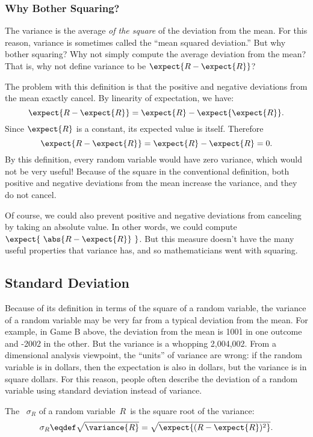 \subsubsection{Why Bother Squaring?}

The variance is the average \emph{of the square} of the deviation from the
mean.  For this reason, variance is sometimes called the ``mean squared
deviation.''  But why bother squaring?  Why not simply compute the average
deviation from the mean?  That is, why not define variance to be
$\expect{R - \expect{R}}$?

The problem with this definition is that the positive and negative
deviations from the mean exactly cancel.  By linearity of expectation,
we have:
\[
  \expect{R - \expect{R}} = \expect{R} - \expect{\expect{R}}.
\]
Since $\expect{R}$ is a constant, its expected value is itself. Therefore
\[
\expect{R - \expect{R}} = \expect{R} - \expect{R} = 0.
\]
By this definition, every random variable would have zero variance,
which would not be very useful!  Because of the square in the
conventional definition, both positive and negative deviations from
the mean increase the variance, and they do not cancel.

Of course, we could also prevent positive and negative deviations from
canceling by taking an absolute value.  In other words, we could
compute $\expect{\ \abs{R - \expect{R}}\ }$.  But this measure doesn't
have the many useful properties that variance has, and so
mathematicians went with squaring.

\subsection{Standard Deviation}

Because of its definition in terms of the square of a random variable,
the variance of a random variable may be very far from a typical
deviation from the mean.  For example, in Game B above, the deviation
from the mean is 1001 in one outcome and -2002 in the other. But the
variance is a whopping 2,004,002.  From a dimensional analysis
viewpoint, the ``units'' of variance are wrong: if the random variable
is in dollars, then the expectation is also in dollars, but the
variance is in square dollars.  For this reason, people often describe
the deviation of a random variable using standard deviation instead of
variance.

\begin{definition}
The ~$\sigma_R$ of a random variable~$R$~is
the square root of the variance:
\[
    \sigma_R \eqdef \sqrt{\variance{R}} = \sqrt{\expect{(R - \expect{R})^2}}.
\]
\end{definition}

